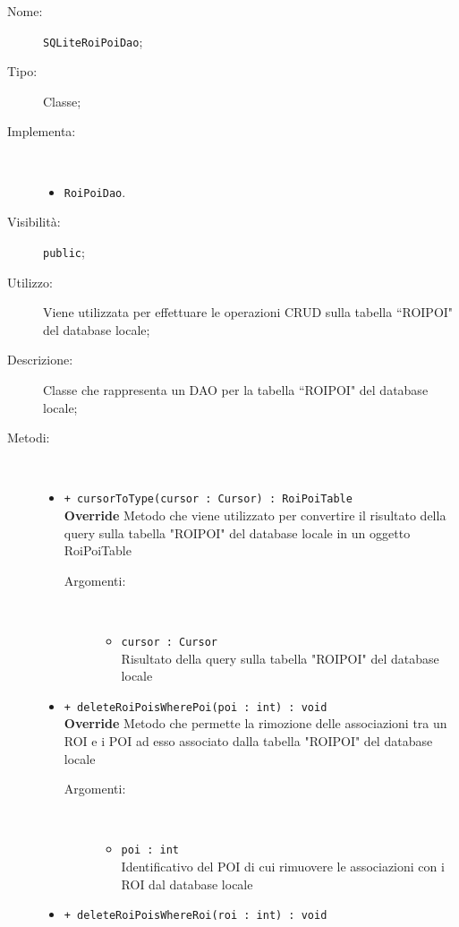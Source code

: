 \documentclass[../DefinizioneDiProdotto.tex]{subfiles}
\begin{document}
    \begin{description}
\item[Nome:] \texttt{SQLiteRoiPoiDao};
\item[Tipo:] Classe;
\item[Implementa:] \
\begin{itemize}
\item \texttt{RoiPoiDao}.

\end{itemize}
\item[Visibilità:] \texttt{public};
\item[Utilizzo:] Viene utilizzata per effettuare le operazioni CRUD sulla tabella “ROIPOI" del database locale;
\item[Descrizione:] Classe che rappresenta un DAO per la tabella “ROIPOI" del database locale;
\item[Metodi:] \
\begin{itemize}
\item \texttt{+ cursorToType(cursor : Cursor) : RoiPoiTable}\\
\textbf{Override} Metodo che viene utilizzato per convertire il risultato della query sulla tabella "ROIPOI" del database locale in un oggetto RoiPoiTable
 \begin{description}
\item[Argomenti:] \
\begin{itemize}
\item \texttt{cursor : Cursor}\\
Risultato della query sulla tabella "ROIPOI" del database locale\end{itemize}
\end{description}
\item \texttt{+ deleteRoiPoisWherePoi(poi : int) : void}\\
\textbf{Override} Metodo che permette la rimozione delle associazioni tra un ROI e i POI ad esso associato dalla tabella "ROIPOI" del database locale 
 \begin{description}
\item[Argomenti:] \
\begin{itemize}
\item \texttt{poi : int}\\
Identificativo del POI di cui rimuovere le associazioni con i ROI dal database locale\end{itemize}
\end{description}
\item \texttt{+ deleteRoiPoisWhereRoi(roi : int) : void}\\

\end{itemize}
\end{description}
\end{document}
